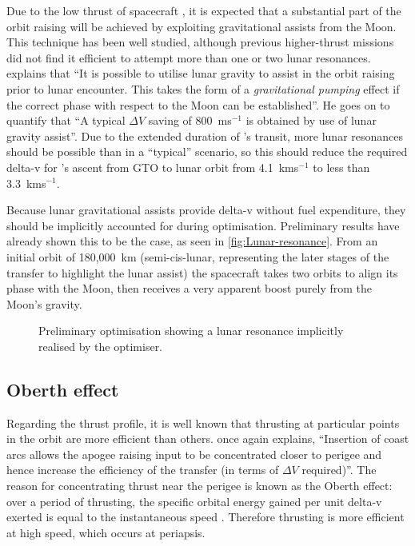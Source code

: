Due to the low thrust of spacecraft \BW, it is expected that a substantial part of the orbit raising will be achieved by exploiting gravitational assists from the Moon. This technique has been well studied, although previous higher-thrust missions did not find it efficient to attempt more than one or two lunar resonances. \textcite{Kemble2006} explains that \enquote{It is possible to utilise lunar gravity to assist in the orbit raising prior to lunar encounter. This takes the form of a \emph{gravitational pumping} effect if the correct phase with respect to the Moon can be established}. He goes on to quantify that \enquote{A typical $\Delta V$ saving of 800~ms$^{-1}$ is obtained by use of lunar gravity assist}. Due to the extended duration of \BW's transit, more lunar resonances should be possible than in a \enquote{typical} scenario, so this should reduce the required delta-v for \BW's ascent from GTO to lunar orbit from 4.1~kms$^{-1}$ to less than 3.3~kms$^{-1}$.

Because lunar gravitational assists provide delta-v without fuel expenditure, they should be implicitly accounted for during optimisation. Preliminary results have already shown this to be the case, as seen in \autoref{fig:Lunar-resonance}. From an initial orbit of 180,000~km (semi-cis-lunar, representing the later stages of the transfer to highlight the lunar assist) the spacecraft takes two orbits to align its phase with the Moon, then receives a very apparent boost purely from the Moon's gravity.

\begin{figure}
\centering
\caption{Preliminary optimisation showing a lunar resonance implicitly realised by the optimiser.}
\label{fig:Lunar-resonance}
\end{figure}

\subsection{Oberth effect} \label{sub:Oberth}

Regarding the thrust profile, it is well known that thrusting at particular points in the orbit are more efficient than others. \textcite{Kemble2006} once again explains, \enquote{Insertion of coast arcs allows the apogee raising input to be concentrated closer to perigee and hence increase the efficiency of the transfer (in terms of $\Delta V$ required)}. The reason for concentrating thrust near the perigee is known as the Oberth effect: over a period of thrusting, the specific orbital energy gained per unit delta-v exerted is equal to the instantaneous speed \parencite{Oberth1923}. Therefore thrusting is more efficient at high speed, which occurs at periapsis.
 
